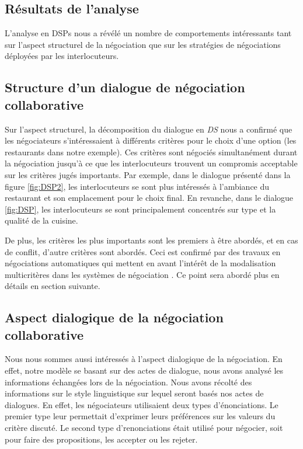 \subsection{Résultats de l'analyse}

L'analyse en DSPs nous a révélé un nombre de comportements intéressants tant sur l'aspect structurel de la négociation que sur les stratégies de négociations déployées par les interlocuteurs. 	

\subsection{Structure d'un dialogue de négociation collaborative}

Sur l'aspect structurel, la décomposition du dialogue en \emph{DS} nous a confirmé que les négociateurs s'intéressaient à différents critères pour le choix d'une option (les restaurants dans notre exemple). Ces critères sont négociés simultanément durant la négociation jusqu'à ce que les interlocuteurs trouvent un compromis acceptable sur les critères jugés importants. 
Par exemple, dans le dialogue présenté dans la figure \ref{fig:DSP2}, les interlocuteurs se sont plus intéressés à l'ambiance du restaurant et son emplacement pour le choix final. En revanche, dans le dialogue \ref{fig:DSP}, les interlocuteurs se sont principalement concentrés sur type et la qualité de la cuisine.

De plus, les critères les plus importants sont les premiers à être abordés, et en cas de conflit, d'autre critères sont abordés. 
Ceci est confirmé par des travaux en négociations automatiques qui mettent en avant l'intérêt de la modalisation multicritères dans les systèmes de négociation \cite{jonker2007agent,lai2004literature}. Ce point sera abordé plus en détails en section suivante. 

\subsection{Aspect dialogique de la négociation collaborative}
\label{sec:aspectDial}
Nous nous sommes aussi intéressés à l'aspect dialogique de la négociation. En effet, notre modèle se basant sur des actes de dialogue, nous avons analysé les informations échangées lors de la négociation. 
Nous avons récolté des informations sur le style linguistique sur lequel seront basés nos actes de dialogues. En effet, les négociateurs utilisaient deux types d'énonciations. Le premier type leur permettait d'exprimer leurs préférences sur les valeurs du critère discuté. Le second type d'renonciations était utilisé pour négocier, soit pour faire des propositions, les accepter ou les rejeter. 

